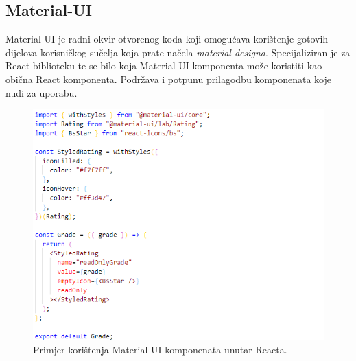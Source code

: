 \documentclass[times, utf8, zavrsni, numeric]{fer}
\begin{document}
			\subsection{Material-UI}
			Material-UI\cite{materialUI2021} je radni okvir otvorenog koda koji omogućava korištenje gotovih dijelova korisničkog sučelja koja prate načela \textit{material designa}. Specijaliziran je za React biblioteku te se bilo koja Material-UI komponenta može koristiti kao obična React komponenta. Podržava i potpunu prilagodbu komponenata koje nudi za uporabu.
			\begin{figure}[H]
				\centering
				\includegraphics[scale=0.75]{pictures/prikazi/MaterialUI.png}
				\caption{Primjer korištenja Material-UI komponenata unutar Reacta.}
				\label{fig:materialUI}
			\end{figure}
			
\end{document}
